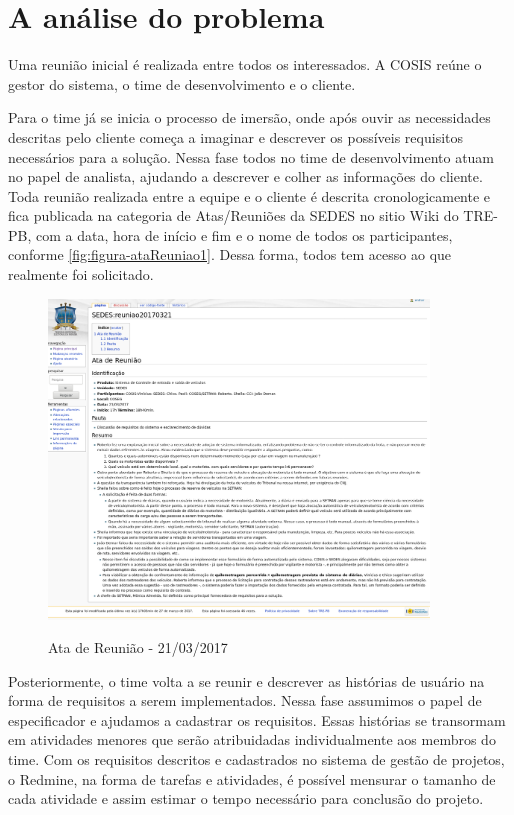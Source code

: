 \section{A análise do problema}
\label{sec:atividadesRealizadasInicio}

Uma reunião inicial é realizada entre todos os interessados. A COSIS reúne o gestor do sistema, o time de desenvolvimento e o cliente. 

Para o time já se inicia o processo de imersão, onde após ouvir as necessidades descritas pelo cliente começa a imaginar e descrever os possíveis requisitos necessários para a solução. 
Nessa fase todos no time de desenvolvimento atuam no papel de analista, ajudando a descrever e colher as informações do cliente.
Toda reunião realizada entre a equipe e o cliente é descrita cronologicamente e fica publicada na categoria de Atas/Reuniões da SEDES no sitio Wiki do TRE-PB, com a data, hora de início e fim e o nome de todos os participantes, conforme \autoref{fig:figura-ataReuniao1}. Dessa forma, todos tem acesso ao que realmente foi solicitado.

\begin{figure}[!htb]
    \centering
    \caption{Ata de Reunião - 21/03/2017}
    \includegraphics[width=0.9\textwidth]{dados/figuras/veiculos-reuniao20170321}
    \label{fig:figura-ataReuniao1}
\end{figure}

Posteriormente, o time volta a se reunir e descrever as histórias de usuário na forma de requisitos a serem implementados. 
Nessa fase assumimos o papel de especificador e ajudamos a cadastrar os requisitos.
Essas histórias se transormam em atividades menores que serão atribuidadas individualmente aos membros do time.
Com os requisitos descritos e cadastrados no sistema de gestão de projetos, o Redmine, na forma de tarefas e atividades, é possível mensurar o tamanho de cada atividade e assim estimar o tempo necessário para conclusão do projeto.  

